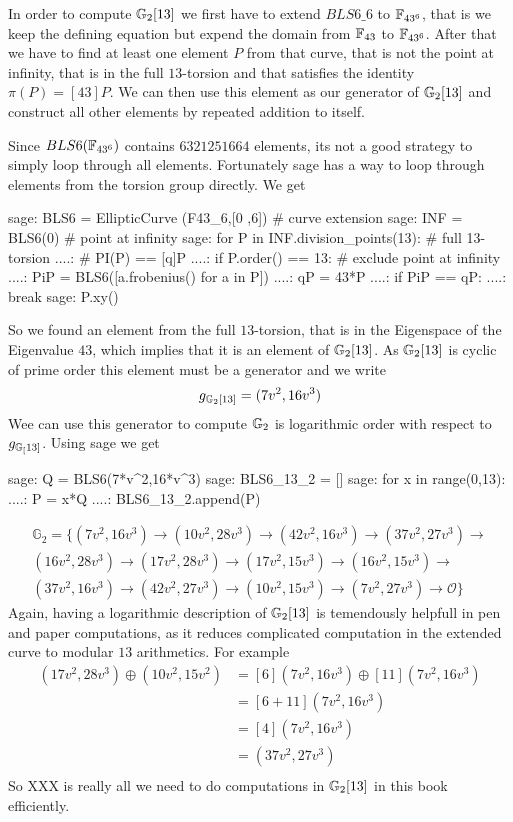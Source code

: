 In order to compute $\mathbb{G}_2[13]$ we first have to extend $BLS6\_6$ to $\mathbb{F}_{43^6}$, that is we keep the defining equation but expend the domain from $\mathbb{F}_{43}$ to $\mathbb{F}_{43^6}$. After that we have to find at least one element $P$ from that curve, that is not the point at infinity, that is in the full $13$-torsion and that satisfies the identity $\pi(P) = [43]P$. We can then use this element as our generator of $\mathbb{G}_2[13]$ and construct all other elements by repeated addition to itself.

Since $BLS6(\mathbb{F}_{43^6})$ contains $6321251664$ elements, its not a good strategy to simply loop through all elements. Fortunately sage has a way to loop through elements from the torsion group directly. We get
\begin{sagecommandline}
sage: BLS6 = EllipticCurve (F43_6,[0 ,6]) # curve extension
sage: INF = BLS6(0) # point at infinity
sage: for P in INF.division_points(13): # full 13-torsion
....: # PI(P) == [q]P
....:     if P.order() == 13: # exclude point at infinity
....:         PiP = BLS6([a.frobenius() for a in P])
....:         qP = 43*P
....:         if PiP == qP:
....:             break
sage: P.xy()
\end{sagecommandline}
So we found an element from the full $13$-torsion, that is in the Eigenspace of the Eigenvalue $43$, which implies that it is an element of $\mathbb{G}_2[13]$. As $\mathbb{G}_2[13]$ is cyclic of prime order this element must be a generator and we write
\begin{equation}
g_{\mathbb{G}_2[13]} = (7v^2, 16v^3)
\end{equation}
Wee can use this generator to compute $\mathbb{G}_2$ is logarithmic order with respect to $g_{\mathbb{G}_[13]}$. Using sage we get
\begin{sagecommandline}
sage: Q = BLS6(7*v^2,16*v^3)
sage: BLS6_13_2 = []
sage: for x in range(0,13):
....:     P = x*Q
....:     BLS6_13_2.append(P)
\end{sagecommandline}
\begin{multline*}
\mathbb{G}_2=\{
(7v^2, 16v^3) \to
(10v^2, 28v^3)\to
(42v^2, 16v^3)\to
(37v^2, 27v^3)\to\\
(16v^2, 28v^3)\to
(17v^2, 28v^3)\to
(17v^2, 15v^3)\to
(16v^2, 15v^3)\to\\
(37v^2, 16v^3)\to
(42v^2, 27v^3)\to
(10v^2, 15v^3)\to
(7v^2, 27v^3)\to
\mathcal{O}\}
\end{multline*}
Again, having a logarithmic description of $\mathbb{G}_2[13]$ is temendously helpfull in pen and paper computations, as it reduces complicated computation in the extended curve to modular $13$ arithmetics. For example 
\begin{align*}
(17v^2,28v^3)\oplus (10v^2,15v^2)  & = [6](7v^2,16v^3)\oplus [11](7v^2,16v^3)\\
                      & = [6+11](7v^2,16v^3)\\
                      & = [4](7v^2,16v^3)\\
                      & = (37v^2,27v^3)\\
\end{align*}
So XXX is really all we need to do computations in $\mathbb{G}_2[13]$ in this book efficiently. 

